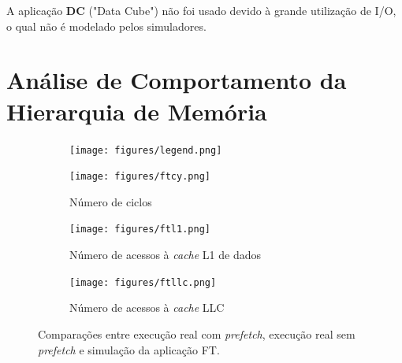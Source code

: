 \documentclass[12pt]{article}
\begin{document}
\vspace{-1mm}
A aplicação \textbf{DC} ("Data Cube") não foi usado devido à grande utilização de I/O, o qual não é modelado pelos simuladores.

\vspace{-2mm}
\section{Análise de Comportamento da Hierarquia de Memória}\label{resultados}

\begin{figure}[t]
  \hspace{+25mm}
  \begin{subfigure}{0.33\textwidth}
    \centering
        \texttt{[image: figures/legend.png]}
    \label{fig:leg}
  \end{subfigure}
  \vspace{-5mm}

  \begin{subfigure}{0.33\textwidth}
    \centering
    \vspace{-4mm}
        \texttt{[image: figures/ftcy.png]}
    \caption{Número de ciclos}
    \label{fig:ftcycles}
  \end{subfigure}%
  \begin{subfigure}{0.33\textwidth}
    \centering	
        \texttt{[image: figures/ftl1.png]}
    \caption{Número de acessos à \textit{cache} L1 de dados}
    \label{fig:ftl1}
  \end{subfigure}%
  \begin{subfigure}{0.33\textwidth}
    \centering	
        \texttt{[image: figures/ftllc.png]}
    \caption{Número de acessos à \textit{cache} LLC}
    \label{fig:ftllc}
  \end{subfigure}
  
  \caption{Comparações entre execução real com \textit{prefetch}, execução real sem \textit{prefetch} e simulação da aplicação FT.}
  \label{ref:ft}
\end{figure}
\end{document}
